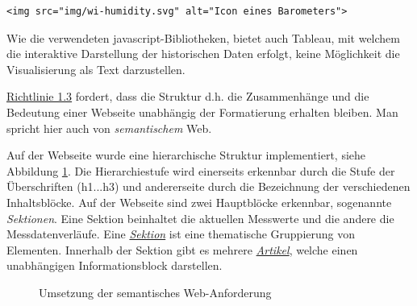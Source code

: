 \begin{lstlisting}[label=lst:altImg,caption=Alternativtext für Icons, language=HTML5, style=htmlcssjs]
<img src="img/wi-humidity.svg" alt="Icon eines Barometers">
\end{lstlisting}

Wie die verwendeten javascript-Bibliotheken, bietet auch Tableau, mit welchem die interaktive Darstellung der historischen Daten erfolgt, keine Möglichkeit die Visualisierung als Text darzustellen. \newline

\noindent
\href{https://www.w3.org/Translations/WCAG20-de/#text-equiv}{Richtlinie 1.3} fordert, dass die Struktur d.h. die Zusammenhänge und die Bedeutung einer Webseite unabhängig der Formatierung erhalten bleiben. Man spricht hier auch von \textit{semantischem} Web.

Auf der Webseite wurde eine hierarchische Struktur implementiert, siehe Abbildung \ref{img:semWeb}. Die Hierarchiestufe wird einerseits erkennbar durch die Stufe der Überschriften (h1...h3) und andererseite durch die Bezeichnung der verschiedenen Inhaltsblöcke. Auf der Webseite sind zwei Hauptblöcke erkennbar, sogenannte \textit{Sektionen}. Eine Sektion beinhaltet die aktuellen Messwerte und die andere die Messdatenverläufe. Eine \href{https://www.w3.org/TR/2011/WD-html5-20110525/sections.html#the-section-element}{\textit{Sektion}} ist eine thematische Gruppierung von Elementen. Innerhalb der Sektion gibt es mehrere \href{https://www.w3.org/TR/2011/WD-html5-20110525/sections.html#the-article-element}{\textit{Artikel}}, welche einen unabhängigen Informationsblock darstellen.

\begin{figure}[h!]
	\centering
	\caption{Umsetzung der semantisches Web-Anforderung}
	\label{img:semWeb}
\end{figure}


